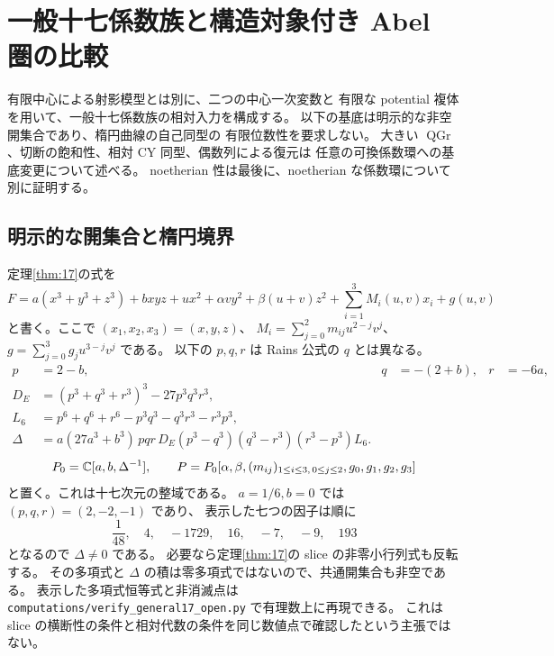 \section{一般十七係数族と構造対象付き Abel 圏の比較}
\label{sec:general17-relative-algebra}

有限中心による射影模型とは別に、二つの中心一次変数と
有限な potential 複体を用いて、一般十七係数族の相対入力を構成する。
以下の基底は明示的な非空開集合であり、楕円曲線の自己同型の
有限位数性を要求しない。
大きい $\operatorname{QGr}$、切断の飽和性、相対 CY 同型、偶数列による復元は
任意の可換係数環への基底変更について述べる。
noetherian 性は最後に、noetherian な係数環について別に証明する。

\subsection{明示的な開集合と楕円境界}

定理\ref{thm:17}の式を
\begin{equation}\label{eq:general17-explicit-potential}
 F=a(x^3+y^3+z^3)+bxyz+ux^2+\alpha vy^2+\beta(u+v)z^2
   +\sum_{i=1}^3 M_i(u,v)x_i+g(u,v)
\end{equation}
と書く。ここで $(x_1,x_2,x_3)=(x,y,z)$、
$M_i=\sum_{j=0}^2m_{ij}u^{2-j}v^j$、
$g=\sum_{j=0}^3g_ju^{3-j}v^j$ である。
以下の $p,q,r$ は Rains 公式の $q$ とは異なる。
\begin{align*}
 p&=2-b,&q&=-(2+b),&r&=-6a,\\
 D_E&=(p^3+q^3+r^3)^3-27p^3q^3r^3,\\
 L_6&=p^6+q^6+r^6-p^3q^3-q^3r^3-r^3p^3,\\
 \Delta&=a(27a^3+b^3)\,pqr\,D_E
 (p^3-q^3)(q^3-r^3)(r^3-p^3)L_6.
\end{align*}
\begin{equation}\label{eq:general17-coefficient-ring}
 P_0=\mathbb C[a,b,\Delta^{-1}],\qquad
 P=P_0[\alpha,\beta,(m_{ij})_{1\leq i\leq3,\,0\leq j\leq2},g_0,g_1,g_2,g_3]
\end{equation}
と置く。これは十七次元の整域である。
$a=1/6,b=0$ では $(p,q,r)=(2,-2,-1)$ であり、
表示した七つの因子は順に
\[
 \frac1{48},\quad4,\quad-1729,\quad16,\quad-7,\quad-9,\quad193
\]
となるので $\Delta\ne0$ である。
必要なら定理\ref{thm:17}の slice の非零小行列式も反転する。
その多項式と $\Delta$ の積は零多項式ではないので、共通開集合も非空である。
表示した多項式恒等式と非消滅点は
\nolinkurl{computations/verify_general17_open.py} で有理数上に再現できる。
これは slice の横断性の条件と相対代数の条件を同じ数値点で確認したという主張ではない。

